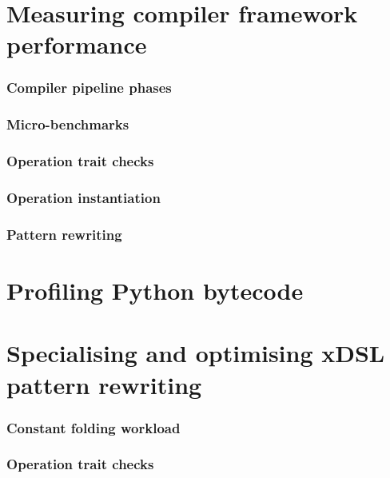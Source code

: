 
\chapter{Measuring compiler framework performance}
\label{chap:measuring-compiler-performance}



\subsection{Compiler pipeline phases}

\subsection{Micro-benchmarks}
\subsection{Operation trait checks}
\subsection{Operation instantiation}

\subsection{Pattern rewriting}





\chapter{Profiling Python bytecode} %


\chapter{Specialising and optimising xDSL pattern rewriting}

\subsection{Constant folding workload}

\subsection{Operation trait checks}

